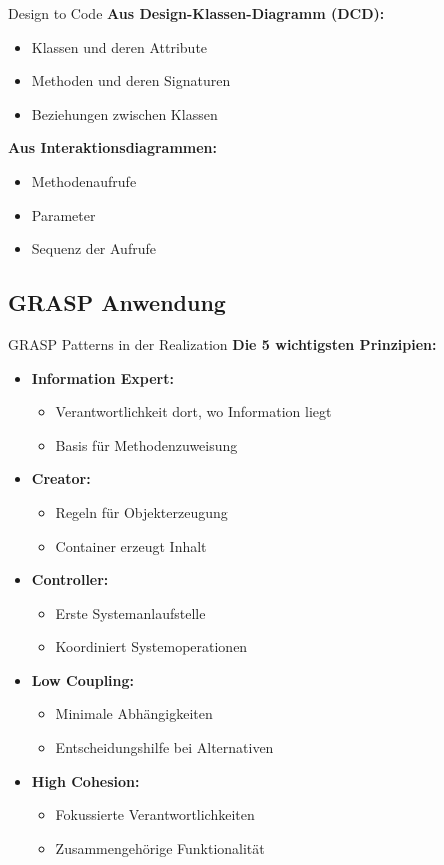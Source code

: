 \begin{KR}{Design to Code}
\textbf{Aus Design-Klassen-Diagramm (DCD):}
\begin{itemize}
    \item Klassen und deren Attribute
    \item Methoden und deren Signaturen
    \item Beziehungen zwischen Klassen
\end{itemize}

\textbf{Aus Interaktionsdiagrammen:}
\begin{itemize}
    \item Methodenaufrufe
    \item Parameter
    \item Sequenz der Aufrufe
\end{itemize}
\end{KR}

\subsection{GRASP Anwendung}

\begin{KR}{GRASP Patterns in der Realization}
\textbf{Die 5 wichtigsten Prinzipien:}
\begin{itemize}
    \item \textbf{Information Expert:}
    \begin{itemize}
        \item Verantwortlichkeit dort, wo Information liegt
        \item Basis für Methodenzuweisung
    \end{itemize}
    \item \textbf{Creator:}
    \begin{itemize}
        \item Regeln für Objekterzeugung
        \item Container erzeugt Inhalt
    \end{itemize}
    \item \textbf{Controller:}
    \begin{itemize}
        \item Erste Systemanlaufstelle
        \item Koordiniert Systemoperationen
    \end{itemize}
    \item \textbf{Low Coupling:}
    \begin{itemize}
        \item Minimale Abhängigkeiten
        \item Entscheidungshilfe bei Alternativen
    \end{itemize}
    \item \textbf{High Cohesion:}
    \begin{itemize}
        \item Fokussierte Verantwortlichkeiten
        \item Zusammengehörige Funktionalität
    \end{itemize}
\end{itemize}
\end{KR}

